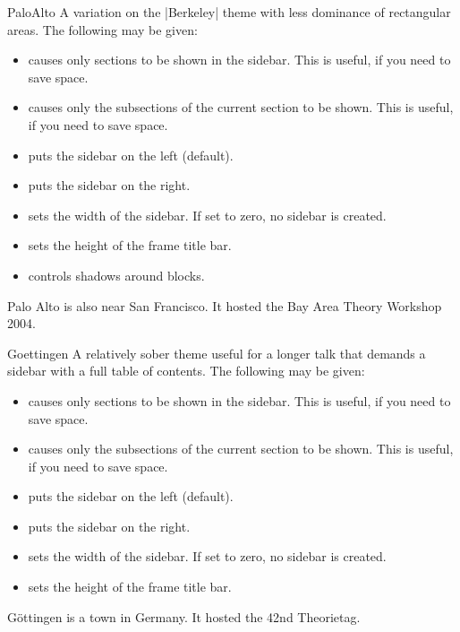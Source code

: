 \begin{themeexample}{PaloAlto}
  A variation on the |Berkeley| theme with less dominance of rectangular areas. The following  may be given:
  \begin{itemize}
  \item {} causes only sections to be shown in the sidebar. This is useful, if you need to save space.
  \item {} causes only the subsections of the current section to be shown. This is useful, if you need to save space.
  \item {} puts the sidebar on the left (default).
  \item {} puts the sidebar on the right.
  \item {} sets the width of the sidebar. If set to zero, no sidebar is created.
  \item {} sets the height of the frame title bar.
  \item {} controls shadows around blocks.
  \end{itemize}

  Palo Alto is also near San Francisco. It hosted the Bay Area Theory Workshop 2004.
\end{themeexample}

\begin{themeexample}{Goettingen}
  A relatively sober theme useful for a longer talk that demands a sidebar with a full table of contents. The following  may be given:
  \begin{itemize}
  \item {} causes only sections to be shown in the sidebar. This is useful, if you need to save space.
  \item {} causes only the subsections of the current section to be shown. This is useful, if you need to save space.
  \item {} puts the sidebar on the left (default).
  \item {} puts the sidebar on the right.
  \item {} sets the width of the sidebar. If set to zero, no sidebar is created.
  \item {} sets the height of the frame title bar.
  \end{itemize}

  G\"ottingen is a town in Germany. It hosted the 42nd Theorietag.
\end{themeexample}

